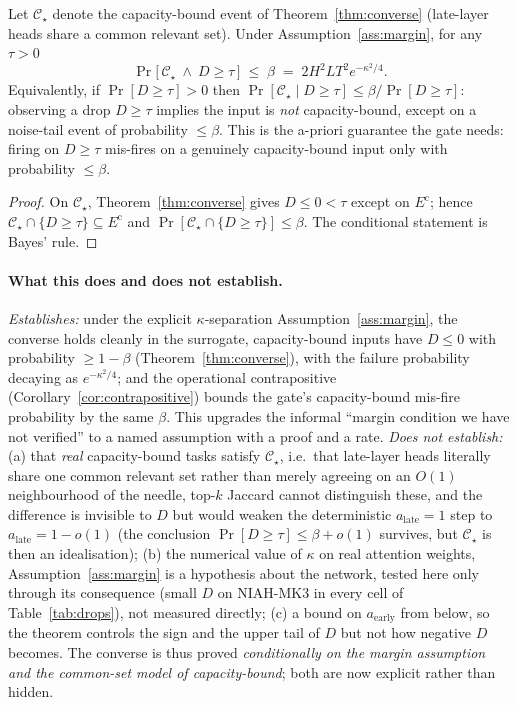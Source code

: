 \begin{corollary}
\label{cor:contrapositive}
Let $\mathcal{C}_\star$ denote the capacity-bound event of
Theorem~\ref{thm:converse} (late-layer heads share a common relevant set).
Under Assumption~\ref{ass:margin}, for any $\tau>0$
\begin{equation}
\label{eq:contrapositive}
\Pr\bigl[\,\mathcal{C}_\star \ \wedge\ D\ge\tau\,\bigr]\;\le\;\beta
\;=\;2H^2 L T^2 e^{-\kappa^2/4}.
\end{equation}
Equivalently, if $\Pr[D\ge\tau]>0$ then
$\Pr[\mathcal{C}_\star \mid D\ge\tau]\le \beta/\Pr[D\ge\tau]$: observing a drop
$D\ge\tau$ implies the input is \emph{not} capacity-bound, except on a
noise-tail event of probability $\le\beta$. This is the a-priori guarantee the
gate needs: firing on $D\ge\tau$ mis-fires on a genuinely capacity-bound input
only with probability $\le\beta$.
\end{corollary}

\begin{proof}
On $\mathcal{C}_\star$, Theorem~\ref{thm:converse} gives $D\le0<\tau$ except on
$E^{\mathrm c}$; hence $\mathcal{C}_\star\cap\{D\ge\tau\}\subseteq E^{\mathrm c}$
and $\Pr[\mathcal{C}_\star\cap\{D\ge\tau\}]\le\beta$. The conditional statement
is Bayes' rule.
\end{proof}

\paragraph{What this does and does not establish.}
\emph{Establishes:} under the explicit $\kappa$-separation
Assumption~\ref{ass:margin}, the converse holds cleanly in the
surrogate, capacity-bound inputs have $D\le0$ with probability $\ge1-\beta$
(Theorem~\ref{thm:converse}), with the failure probability decaying as
$e^{-\kappa^2/4}$; and the operational contrapositive
(Corollary~\ref{cor:contrapositive}) bounds the gate's capacity-bound
mis-fire probability by the same $\beta$. This upgrades the informal ``margin
condition we have not verified'' to a named assumption with a proof and a
rate. \emph{Does not establish:} (a) that \emph{real} capacity-bound tasks
satisfy $\mathcal{C}_\star$, i.e.\ that late-layer heads literally share one
common relevant set rather than merely agreeing on an $O(1)$ neighbourhood of
the needle, top-$k$ Jaccard cannot distinguish these, and the difference is
invisible to $D$ but would weaken the deterministic $a_{\mathrm{late}}=1$ step
to $a_{\mathrm{late}}=1-o(1)$ (the conclusion $\Pr[D\ge\tau]\le\beta+o(1)$
survives, but $\mathcal{C}_\star$ is then an idealisation); (b) the numerical
value of $\kappa$ on real attention weights, Assumption~\ref{ass:margin} is a
hypothesis about the network, tested here only through its consequence (small
$D$ on NIAH-MK3 in every cell of Table~\ref{tab:drops}), not measured directly;
(c) a bound on $a_{\mathrm{early}}$ from below, so the theorem controls the sign
and the upper tail of $D$ but not how negative $D$ becomes. The converse is
thus proved \emph{conditionally on the margin assumption and the common-set
model of capacity-bound}; both are now explicit rather than hidden.

